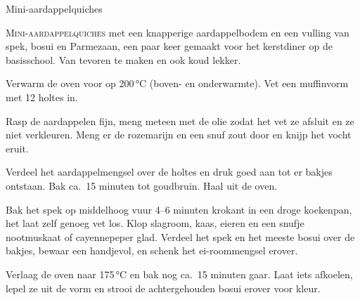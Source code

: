 \begin{recipe}{Mini-aardappelquiches}


\lettrine{M}{ini-aardappelquiches} met een knapperige aardappelbodem en een vulling
van spek, bosui en Parmezaan, een paar keer gemaakt voor het kerstdiner op de
basisschool. Van tevoren te maken en ook koud lekker.

\begin{ingredients}
\end{ingredients}

\begin{steps}
  \item Verwarm de oven voor op 200\,°C (boven- en onderwarmte). Vet een muffinvorm met 12 holtes in.
  \item Rasp de aardappelen fijn, meng meteen met de olie zodat het vet ze afsluit en
        ze niet verkleuren. Meng er de rozemarijn en een snuf zout door en knijp het
        vocht eruit.
  \item Verdeel het aardappelmengsel over de holtes en druk goed aan tot er bakjes
        ontstaan. Bak ca.\ 15 minuten tot goudbruin. Haal uit de oven.
  \item Bak het spek op middelhoog vuur 4--6 minuten krokant in een droge koekenpan,
        het laat zelf genoeg vet los. Klop slagroom, kaas, eieren en een snufje
        nootmuskaat of cayennepeper glad. Verdeel het spek en het meeste bosui over
        de bakjes, bewaar een handjevol, en schenk het ei-roommengsel erover.
  \item Verlaag de oven naar 175\,°C en bak nog ca.\ 15 minuten gaar. Laat iets
        afkoelen, lepel ze uit de vorm en strooi de achtergehouden bosui erover voor
        kleur.
\end{steps}
\end{recipe}
